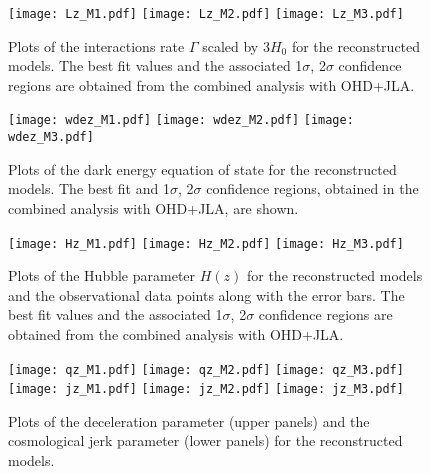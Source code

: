 \documentclass[11pt]{article}
\begin{document}
\begin{figure}[tb]
\begin{center}
\texttt{[image: Lz\_M1.pdf]}
\texttt{[image: Lz\_M2.pdf]}
\texttt{[image: Lz\_M3.pdf]}
\end{center}
\caption{{\small Plots of the interactions rate $\Gamma$ scaled by $3H_0$ for the reconstructed models. The best fit values and the associated 1$\sigma$, 2$\sigma$ confidence regions are obtained from the combined analysis with OHD+JLA.}}
\label{gamma}
\end{figure}




\begin{figure}[tb]
\begin{center}
\texttt{[image: wdez\_M1.pdf]}
\texttt{[image: wdez\_M2.pdf]}
\texttt{[image: wdez\_M3.pdf]}
\end{center}
\caption{{\small Plots of the dark energy equation of state for the reconstructed models. The best fit and 1$\sigma$, 2$\sigma$ confidence regions, obtained in the combined analysis with OHD+JLA, are shown.}}
\label{wdeplot}
\end{figure}%




\begin{figure}[tb]
\begin{center}
\texttt{[image: Hz\_M1.pdf]}
\texttt{[image: Hz\_M2.pdf]}
\texttt{[image: Hz\_M3.pdf]}
\end{center}
\caption{{\small Plots of the Hubble parameter $H(z)$ for the reconstructed models and the observational data points along with the error bars. The best fit values and the associated 1$\sigma$, 2$\sigma$ confidence regions are obtained from the combined analysis with OHD+JLA.}}
\label{hubb}
\end{figure}
\begin{figure}[tb]
\begin{center}
\texttt{[image: qz\_M1.pdf]}
\texttt{[image: qz\_M2.pdf]}
\texttt{[image: qz\_M3.pdf]}\\
\texttt{[image: jz\_M1.pdf]}
\texttt{[image: jz\_M2.pdf]}
\texttt{[image: jz\_M3.pdf]}
\end{center}
\caption{{\small Plots of the deceleration parameter (upper panels) and the cosmological jerk parameter (lower panels) for the reconstructed models.}}
\label{qzplot}
\end{figure}
\end{document}
